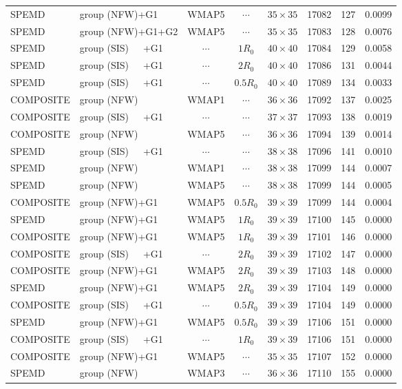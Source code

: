 \documentclass[useAMS,usenatbib]{mnras}
\def\nomicro{$\cdots$}
\def\nodata{$\cdots$}
\begin{document}
\begin{table}
\begin{tabular}{llccccrr}
        SPEMD     & group (NFW)+G1    &WMAP5 & \nomicro  &$35\times35$ & 17082 & 127 & 0.0099\\
        SPEMD     & group (NFW)+G1+G2 &WMAP5 & \nomicro  &$35\times35$ & 17083 & 128 & 0.0076\\
        SPEMD     & group (SIS)~~~+G1 &\nodata& $1R_{0}$  &$40\times40$ & 17084 & 129 & 0.0058\\
        SPEMD     & group (SIS)~~~+G1 &\nodata& $2R_{0}$  &$40\times40$ & 17086 & 131 & 0.0044\\
        SPEMD     & group (SIS)~~~+G1 &\nodata& $0.5R_{0}$&$40\times40$ & 17089 & 134 & 0.0033\\
        COMPOSITE & group (NFW)       &WMAP1 & \nomicro&$36\times36$ & 17092 & 137 & 0.0025\\
        COMPOSITE & group (SIS)~~~+G1 &\nodata& \nomicro&$37\times37$ & 17093 & 138 & 0.0019\\
        COMPOSITE & group (NFW)       &WMAP5 & \nomicro&$36\times36$ & 17094 & 139 & 0.0014\\
        SPEMD     & group (SIS)~~~+G1 &\nodata& \nomicro  &$38\times38$ & 17096 & 141 & 0.0010\\
        SPEMD     & group (NFW)       &WMAP1 & \nomicro  &$38\times38$ & 17099 & 144 & 0.0007\\
        SPEMD     & group (NFW)       &WMAP5 & \nomicro  &$38\times38$ & 17099 & 144 & 0.0005\\
        COMPOSITE & group (NFW)+G1 &WMAP5 & $0.5R_{0}$&$39\times39$ & 17099 & 144 & 0.0004\\
        SPEMD     & group (NFW)+G1    &WMAP5 & $1R_{0}$  &$39\times39$ & 17100 & 145 & 0.0000\\
        COMPOSITE & group (NFW)+G1 &WMAP5 & $1R_{0}$&$39\times39$ & 17101 & 146 & 0.0000\\
        COMPOSITE & group (SIS)~~~+G1 &\nodata& $2R_{0}$&$39\times39$ & 17102 & 147 & 0.0000\\
        COMPOSITE & group (NFW)+G1    &WMAP5 & $2R_{0}$&$39\times39$ & 17103 & 148 & 0.0000\\
        SPEMD     & group (NFW)+G1    &WMAP5 & $2R_{0}$  &$39\times39$ & 17104 & 149 & 0.0000\\
        COMPOSITE & group (SIS)~~~+G1 &\nodata& $0.5R_{0}$&$39\times39$ & 17104 & 149 & 0.0000\\
        SPEMD     & group (NFW)+G1    &WMAP5 & $0.5R_{0}$&$39\times39$ & 17106 & 151 & 0.0000\\
        COMPOSITE & group (SIS)~~~+G1 &\nodata& $1R_{0}$&$39\times39$ & 17106 & 151 & 0.0000\\
        COMPOSITE & group (NFW)+G1    &WMAP5 & \nomicro&$35\times35$ & 17107 & 152 & 0.0000\\
        SPEMD     & group (NFW)       &WMAP3 & \nomicro&$36\times36$ & 17110 & 155 & 0.0000\\
        
        \hline
    \end{tabular}
\end{table}
\end{document}

